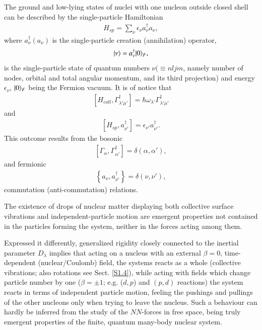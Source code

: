 The ground and low-lying states of nuclei with one nucleon outside closed shell can be described by the single-particle Hamiltonian
\begin{align}\label{eq1.0.10}
H_{sp}=\sum_{\nu}\epsilon_\nu a_\nu^\dagger a_\nu,
\end{align}
where $a_\nu^\dagger (a_\nu)$ is the single-particle creation (annihilation) operator,
\begin{align}\label{eq1.0.11}
|{\nu} \rangle=a_\nu^\dagger|{0} \rangle_F,
\end{align}
is the single-particle state of quantum numbers $\nu(\equiv nljm$, namely number of nodes, orbital and total angular momentum, and its third projection) and energy $\epsilon_\nu$,  $|{0} \rangle_F$ being the Fermion vacuum. 
It is of notice that
\begin{align}\label{eq0.1.14}
\left[H_{coll},\Gamma^\dagger_{\lambda'\mu'}\right]=\hbar\omega_{\lambda'}\Gamma^\dagger_{\lambda'\mu'}
\end{align}
and 
\begin{align}\label{eq0.1.15}
\left[H_{sp},a^\dagger_{\nu'}\right]=\epsilon_{\nu'}a^\dagger_{\nu'}.
\end{align}
	This  outcome results from the bosonic
\begin{align}\label{eq0.1.16}
\left[\Gamma_{\alpha},\Gamma^\dagger_{\alpha'}\right]=\delta(\alpha,\alpha'),
\end{align}
	and fermionic
\begin{align}
\left\{a_\nu,a^\dagger_{\nu'}\right\}=\delta(\nu,\nu'),
\end{align}
commutation (anti-commutation) relations.


 The existence of drops of nuclear matter displaying both collective surface vibrations and independent-particle motion  are emergent properties not contained in the particles forming the system, neither in the forces acting among them. 


Expressed it differently, generalized rigidity closely connected to the inertial parameter $D_\lambda$ implies that acting on a nucleus with an external $\beta=0$, time-dependent (nuclear/Coulomb) field, the systems reacts as a whole (collective vibrations; also rotations see Sect. \ref{S1.4}), while acting with fields which change particle number by one ($\beta=\pm1$; e.g. ($d,p$) and $(p,d)$ reactions) the system reacts in terms of independent particle motion, feeling the pushings and pullings of the other nucleons only when trying to leave the nucleus. Such a behaviour can hardly be inferred from the study of the $NN$-forces in free space, being truly emergent properties of the finite, quantum many-body nuclear system.


